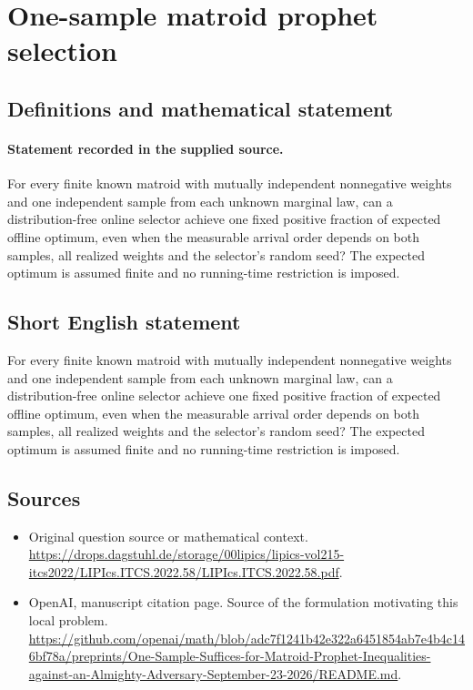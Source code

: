 \documentclass[11pt]{article}
\begin{document}
\section*{One-sample matroid prophet selection}\label{30007469}
\subsection{Definitions and mathematical statement}
\paragraph{Statement recorded in the supplied source.}
For every finite known matroid with mutually independent nonnegative weights and one independent sample from each unknown marginal law, can a distribution-free online selector achieve one fixed positive fraction of expected offline optimum, even when the measurable arrival order depends on both samples, all realized weights and the selector’s random seed? The expected optimum is assumed finite and no running-time restriction is imposed.
\subsection{Short English statement}
For every finite known matroid with mutually independent nonnegative weights and one independent sample from each unknown marginal law, can a distribution-free online selector achieve one fixed positive fraction of expected offline optimum, even when the measurable arrival order depends on both samples, all realized weights and the selector’s random seed? The expected optimum is assumed finite and no running-time restriction is imposed.
\subsection{Sources}
\begin{itemize}
\item[S1] Original question source or mathematical context.
\url{https://drops.dagstuhl.de/storage/00lipics/lipics-vol215-itcs2022/LIPIcs.ITCS.2022.58/LIPIcs.ITCS.2022.58.pdf}.
\item[S2] OpenAI, manuscript citation page. Source of the formulation motivating this local problem.
\url{https://github.com/openai/math/blob/adc7f1241b42e322a6451854ab7e4b4c146bf78a/preprints/One-Sample-Suffices-for-Matroid-Prophet-Inequalities-against-an-Almighty-Adversary-September-23-2026/README.md}.
\end{itemize}
\end{document}
